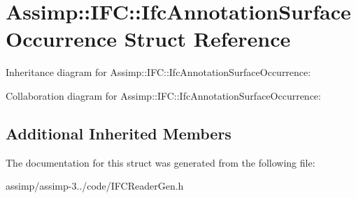 \hypertarget{struct_assimp_1_1_i_f_c_1_1_ifc_annotation_surface_occurrence}{\section{Assimp\+:\+:I\+F\+C\+:\+:Ifc\+Annotation\+Surface\+Occurrence Struct Reference}
\label{struct_assimp_1_1_i_f_c_1_1_ifc_annotation_surface_occurrence}
}


Inheritance diagram for Assimp\+:\+:I\+F\+C\+:\+:Ifc\+Annotation\+Surface\+Occurrence\+:


Collaboration diagram for Assimp\+:\+:I\+F\+C\+:\+:Ifc\+Annotation\+Surface\+Occurrence\+:
\subsection*{Additional Inherited Members}


The documentation for this struct was generated from the following file\+:\begin{DoxyCompactItemize}
\item 
assimp/assimp-\/3../code/I\+F\+C\+Reader\+Gen.\+h\end{DoxyCompactItemize}
